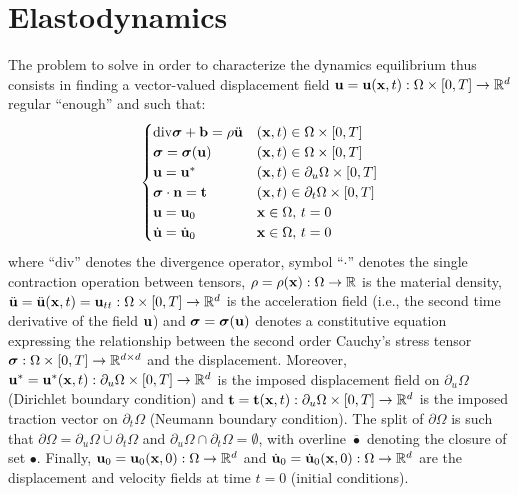 \section{Elastodynamics}

The problem to solve in order to characterize the dynamics equilibrium thus consists in finding a vector-valued displacement field ${\bf{u}}={\bf{u}}({\bf{x}},t):\Omega\times[0,T]\to\mathbb{R}^{d}$
regular ``enough'' and such that: 
\begin{equation}
\begin{cases}
\mathrm{\mathrm{div}}\mbox{\boldmath${\sigma}$}+{\bf{b}}=\rho\ddot{{\bf{u}}} & ({\bf{x}},t)\in\Omega\times[0,T]\\
\mbox{\boldmath${\sigma}$}=\mbox{\boldmath${\sigma}$}({\bf{u}}) & ({\bf{x}},t)\in\Omega\times[0,T]\\
{\bf{u}}={\bf{u}}^{*} & ({\bf{x}},t)\in\partial_{u}\Omega\times[0,T]\\
\mbox{\boldmath${\sigma}$}\cdot{\bf{n}}={\bf t} & ({\bf{x}},t)\in\partial_{t}\Omega\times[0,T]\\
{\bf{u}}={\bf{u}}_{0} & {\bf{x}}\in\Omega,\,t=0\\
\dot{{\bf{u}}}=\dot{{\bf{u}}}_{0} & {\bf{x}}\in\Omega,\,t=0
\end{cases}
\end{equation}
where ``$\mathrm{\mathrm{div}}$'' denotes the divergence operator, symbol ``$\cdot$'' denotes the single contraction operation between tensors, $\rho=\rho({\bf{x}}):\Omega\to\mathbb{R}$ is the material density,
$\ddot{{\bf{u}}}=\ddot{{\bf{u}}}({\bf{x}},t)={\bf{u}}_{tt}:\Omega\times[0,T]\to\mathbb{R}^{d}$ is the acceleration field (i.e., the second time derivative of the field ${\bf{u}}$) and $\mbox{\boldmath${\sigma}$}=\mbox{\boldmath${\sigma}$}({\bf{u}})$ denotes a constitutive equation
expressing the relationship between the second order Cauchy's stress tensor $\mbox{\boldmath${\sigma}$}:\Omega\times[0,T]\to\mathbb{R}^{d\times d}$ and the displacement. Moreover, ${\bf{u}}^{*}={\bf{u}}^{*}({\bf{x}},t):\partial_{u}\Omega\times[0,T]\to\mathbb{R}^{d}$ is the imposed displacement field on $\partial_{u}\Omega$ (Dirichlet
boundary condition) and 
${\bf t}={\bf t}({\bf{x}},t):\partial_{u}\Omega\times[0,T]\to\mathbb{R}^{d}$
is the imposed traction vector on $\partial_{t}\Omega$ (Neumann boundary condition). The split of $\partial\Omega$ is such that $\partial\Omega=\overline{\partial_{u}\Omega\cup\partial_{t}\Omega}$ and $\partial_{u}\Omega\cap\partial_{t}\Omega=\emptyset$, with overline $\overline{\bullet}$ denoting the closure of set $\bullet$. Finally,
${\bf{u}}_{0}={\bf{u}}_{0}({\bf{x}},0):\Omega\to\mathbb{R}^{d}$ and $\dot{{\bf{u}}}_{0}=\dot{{\bf{u}}}_{0}({\bf{x}},0):\Omega\to\mathbb{R}^{d}$
are the displacement and velocity fields at time $t=0$ (initial conditions).

